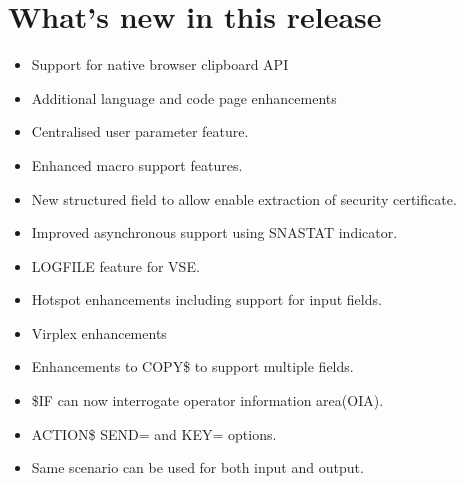 \documentclass[letterpaper,10pt,english]{sphinxmanual}
\begin{document}
\newpage

\ignorespaces 

\chapter{What’s new in this release}
\label{\detokenize{Migration_Guide:what-s-new-in-this-release}}\label{\detokenize{Migration_Guide:index-9}}
\begin{itemize}
\item {} 
Support for native browser clipboard API

\item {} 
Additional language and code page enhancements

\item {} 
Centralised user parameter feature.

\item {} 
Enhanced macro support features.

\item {} 
New structured field to allow enable extraction of security certificate.

\item {} 
Improved asynchronous support using SNASTAT indicator.

\item {} 
LOGFILE feature for VSE.

\item {} 
Hotspot enhancements including support for input fields.

\item {} 
Virplex enhancements

\end{itemize}

\begin{itemize}
\item {} 
Enhancements to COPY\$ to support multiple fields.

\item {} 
\$IF can now interrogate operator information area(OIA).

\item {} 
ACTION\$ SEND= and KEY= options.

\item {} 
Same scenario can be used for both input and output.

\end{itemize}
\end{document}
